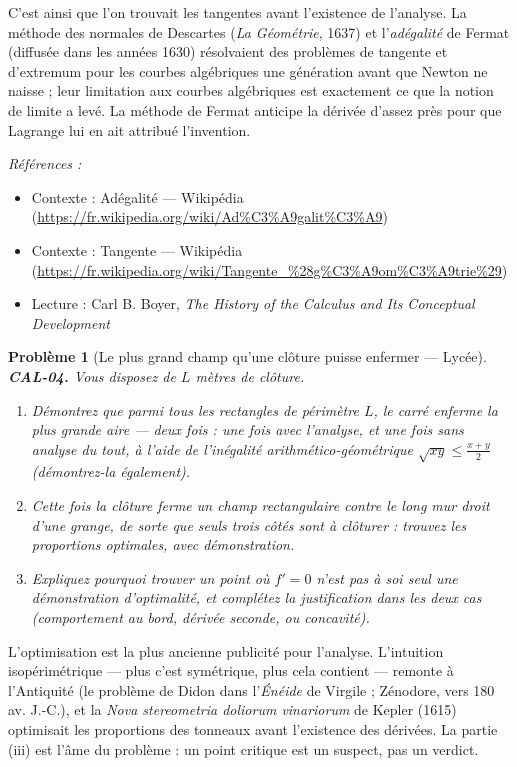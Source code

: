 \documentclass[11pt]{article}
\newtheorem{problem}{Problème}
\newenvironment{refs}{\par\small\noindent\emph{Références :}\begin{itemize}\setlength\itemsep{0pt}}{\end{itemize}\normalsize}
\begin{document}
\noindent C'est ainsi que l'on trouvait les tangentes avant l'existence de l'analyse. La
méthode des normales de Descartes (\textit{La Géométrie}, 1637) et l'\textit{adégalité} de Fermat (diffusée
dans les années 1630) résolvaient des problèmes de tangente et d'extremum pour les courbes algébriques une génération avant que
Newton ne naisse ; leur limitation aux courbes algébriques est exactement ce que la notion de limite
a levé. La méthode de Fermat anticipe la dérivée d'assez près pour que Lagrange lui en ait attribué
l'invention.

\begin{refs}
\item Contexte : Adégalité --- Wikipédia (\url{https://fr.wikipedia.org/wiki/Ad%C3%A9galit%C3%A9})
\item Contexte : Tangente --- Wikipédia (\url{https://fr.wikipedia.org/wiki/Tangente_%28g%C3%A9om%C3%A9trie%29})
\item Lecture : Carl B. Boyer, \textit{The History of the Calculus and Its Conceptual Development}
\end{refs}

\bigskip

\begin{problem}[{Le plus grand champ qu'une clôture puisse enfermer --- Lycée}]
\textbf{CAL-04.} Vous disposez de $ L $ mètres de clôture.
\begin{enumerate}
\item[(i)] Démontrez que
parmi tous les rectangles de périmètre $ L $, le carré enferme la plus grande aire --- deux fois :
une fois avec l'analyse, et une fois sans analyse du tout, à l'aide de l'inégalité arithmético-géométrique
$ \sqrt{xy} \le \frac{x+y}{2} $ (démontrez-la également).
\item[(ii)] Cette fois la clôture ferme un
champ rectangulaire contre le long mur droit d'une grange, de sorte que seuls trois côtés sont à clôturer :
trouvez les proportions optimales, avec démonstration.
\item[(iii)] Expliquez pourquoi trouver un point où
$ f'=0 $ n'est \textit{pas} à soi seul une démonstration d'optimalité, et complétez la justification
dans les deux cas (comportement au bord, dérivée seconde, ou concavité).
\end{enumerate}

\end{problem}

\noindent L'optimisation est la plus ancienne publicité pour l'analyse. L'intuition
isopérimétrique --- plus c'est symétrique, plus cela contient --- remonte à l'Antiquité (le problème de Didon dans
l'\textit{Énéide} de Virgile ; Zénodore, vers 180 av. J.-C.), et la \textit{Nova stereometria
doliorum vinariorum} de Kepler (1615) optimisait les proportions des tonneaux avant l'existence des dérivées.
La partie (iii) est l'âme du problème : un point critique est un suspect, pas un verdict.
\end{document}

